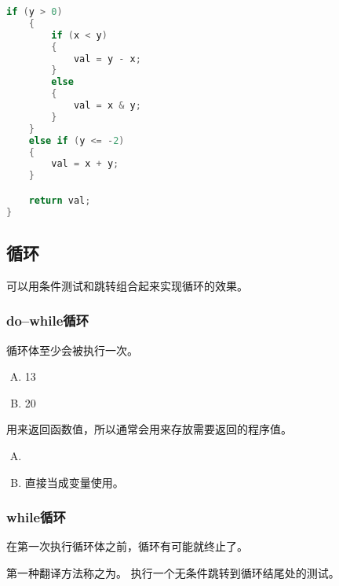 {{\begin{practicec}
\begin{lstlisting}[language=C]
    if (y > 0)
    {
        if (x < y)
        {
            val = y - x;
        }
        else
        {
            val = x & y;
        }
    }
    else if (y <= -2)
    {
        val = x + y;
    }

    return val;
}
            \end{lstlisting}
        \end{practicec}
    }

    \subsection{循环}
    {
        可以用条件测试和跳转组合起来实现循环的效果。

        \subsubsection{do--while循环}
        {
            循环体至少会被执行一次。

            \begin{practicec}
                \begin{enumerate}[A.]
                    \item 13
                    \item 20
                \end{enumerate}
            \end{practicec}

            用来返回函数值，所以通常会用来存放需要返回的程序值。

            \begin{practicec}
                \begin{enumerate}[A.]
                    \item {}
                    \item 直接当成变量使用。
                \end{enumerate}
            \end{practicec}
        }

        \subsubsection{while循环}
        {
            在第一次执行循环体之前，循环有可能就终止了。

            第一种翻译方法称之为。
            执行一个无条件跳转到循环结尾处的测试。

}}}
